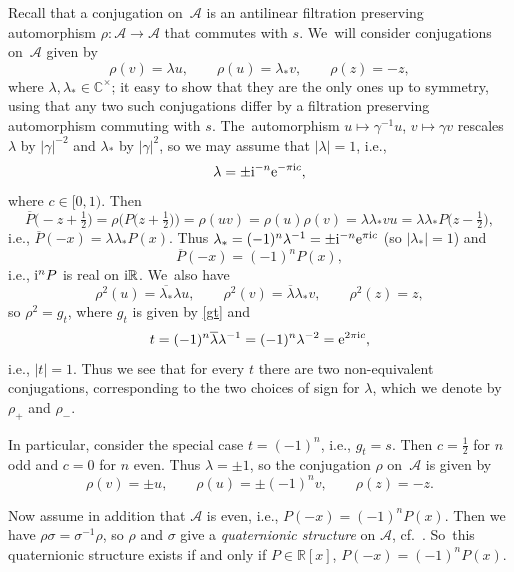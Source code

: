 \documentclass[pdftex]{sigma}
\newcommand{\RN}{\mathbb{R}} %
\newcommand{\ovl}{\overline}
\newcommand{\mc}[1]{\mathcal{#1}}
\theoremstyle{definition}
\numberwithin{equation}{section}
\begin{document}
Recall \cite[Section~3.6]{ES} that a conjugation on~$\mc A$ is an antilinear filtration preserving automorphism $\rho\colon \mc A\to \mc A$ that commutes with $s$. We~will consider conjugations on~$\mc A$
given by
\begin{equation}\label{rho}
\rho(v)=\lambda u,\qquad \rho(u)=\lambda_* v,\qquad \rho(z)=-z,
\end{equation}
where $\lambda,\lambda_*\in \mathbb C^\times$; it easy to show that they are the only ones up to symmetry, using that any two such conjugations differ by a filtration preserving automorphism commuting with $s$. The~auto\-morphism $u\mapsto \gamma^{-1} u$, $v\mapsto \gamma v$ rescales $\lambda$ by $|\gamma|^{-2}$ and $\lambda_*$ by $|\gamma|^2$, so we may assume that $|\lambda|=1$, i.e.,
\[
\lambda=\pm {\rm i}^{-n}{\rm e}^{-\pi {\rm i} c},
\]
where $c\in [0,1)$.
Then
\[
\overline{P}\big({-}z+\tfrac{1}{2}\big)=\rho\big(P\big(z+\tfrac{1}{2}\big)\big)
=\rho(uv)=\rho(u)\rho(v)=\lambda\lambda_* vu=\lambda\lambda_* P\big(z-\tfrac{1}{2}\big),
\]
i.e., $\overline{P}(-x)=\lambda\lambda_* P(x)$. Thus $\lambda_*=(-1)^n\lambda^{-1}=\pm {\rm i}^{-n}{\rm e}^{\pi {\rm i}c}$ (so $|\lambda_*|=1$) and
\[
\ovl{P}(-x)=(-1)^n P(x),
\]
i.e., ${\rm i}^nP$ is real on ${\rm i}\mathbb R$. We~also have
\[
\rho^2(u)=\overline{\lambda_*}\lambda u,\qquad \rho^2(v)=\overline{\lambda}\lambda_* v,\qquad \rho^2(z)=z,
\]
so $\rho^2=g_t$, where $g_t$ is given by \eqref{gt} and
\[
t=(-1)^n\overline{\lambda}\lambda^{-1}=(-1)^n\lambda^{-2}={\rm e}^{2\pi {\rm i}c},
\]
i.e., $|t|=1$. Thus we see that for every $t$ there are two non-equivalent conjugations, corresponding to the two choices of sign for $\lambda$, which we denote by $\rho_+$ and $\rho_-$.

In particular, consider the special case $t=(-1)^n$, i.e., $g_t=s$. Then $c=\frac{1}{2}$ for $n$ odd and $c=0$ for $n$ even.
Thus $\lambda=\pm 1$, so the conjugation $\rho$ on~$\mc A$ is given by
\[
\rho(v)=\pm u,\qquad \rho(u)=\pm (-1)^nv,\qquad \rho(z)=-z.
\]

Now assume in addition that $\mc A$ is even, i.e., $P(-x)=(-1)^nP(x)$. Then we have $\rho\sigma=\sigma^{-1}\rho$, so $\rho$ and $\sigma$ give a {\it quaternionic structure} on $\mc{A}$, cf.~\cite[Section~3.7]{ES}. So~this quaternionic structure exists if and only if $P\in \RN[x]$, $P(-x)=(-1)^n P(x)$.
\end{document}
